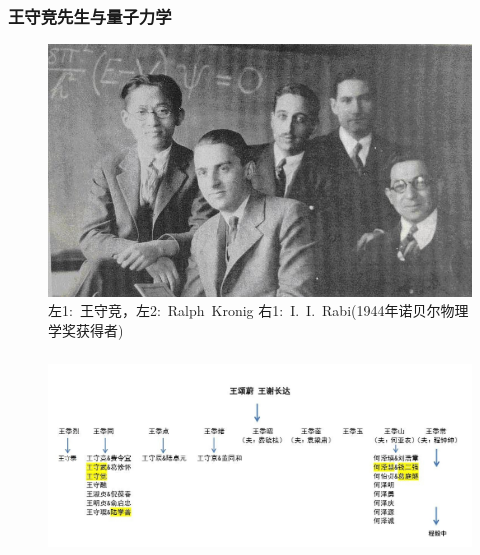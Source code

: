\frame
{
	\frametitle{王守竞先生与量子力学}
\begin{figure}[h!]
\centering
\vspace{-10.5pt}
\includegraphics[height=0.60\textwidth,width=1.0\textwidth,viewport=0 0 560 350,clip]{Figures/Collect_Wang.jpg}
\caption{\textrm{左1:~王守竞，左2:~Ralph~Kronig 右1:~I.~I.~Rabi(1944年诺贝尔物理学奖获得者)}}
\label{Collect_Wang}
\end{figure}
}

\frame
{
	\frametitle{}
\begin{figure}[h!]
\centering
\hspace*{-10.5pt}
\includegraphics[height=0.42\textwidth,width=1.05\textwidth,viewport=0 0 860 350,clip]{Figures/Wang_Family_Suzhou.jpg}
\caption{\fontsize{6.2pt}{5.5pt}}
\label{Wang_Family}
\end{figure}
}

